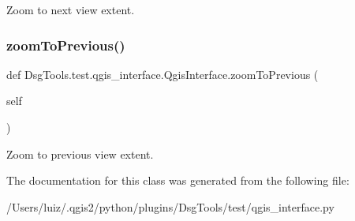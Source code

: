\begin{DoxyVerb}Zoom to next view extent.\end{DoxyVerb}
 \mbox{\label{class_dsg_tools_1_1test_1_1qgis__interface_1_1_qgis_interface_a77f9c624b6571988282de487ede3cf61}} 
\subsubsection{\texorpdfstring{zoom\+To\+Previous()}{zoomToPrevious()}}
{\footnotesize\ttfamily def Dsg\+Tools.\+test.\+qgis\+\_\+interface.\+Qgis\+Interface.\+zoom\+To\+Previous (\begin{DoxyParamCaption}\item[{}]{self }\end{DoxyParamCaption})}

\begin{DoxyVerb}Zoom to previous view extent.\end{DoxyVerb}
 

The documentation for this class was generated from the following file\+:\begin{DoxyCompactItemize}
\item 
/\+Users/luiz/.\+qgis2/python/plugins/\+Dsg\+Tools/test/qgis\+\_\+interface.\+py\end{DoxyCompactItemize}
